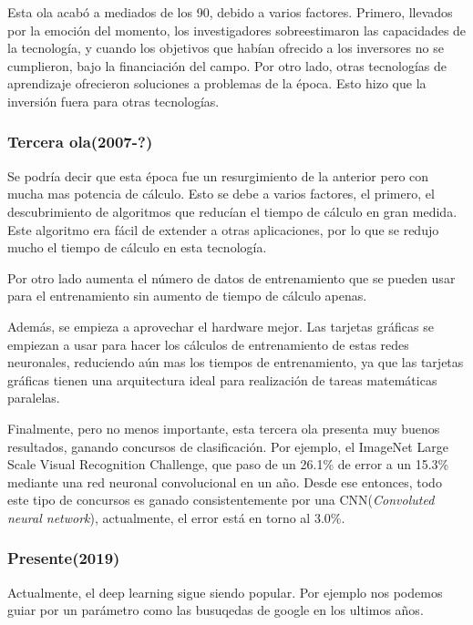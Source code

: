 \documentclass[12pt]{article}
\numberwithin{equation}{section}
\begin{document}
Esta ola acabó a mediados de los 90, debido a varios factores. Primero, llevados por la emoción del momento, los investigadores sobreestimaron las capacidades de la tecnología, y cuando los objetivos que habían ofrecido a los inversores no se cumplieron, bajo la financiación del campo. Por otro lado, otras tecnologías de aprendizaje ofrecieron soluciones a problemas de la época. Esto hizo que la inversión fuera para otras tecnologías.

\subsubsection{Tercera ola(2007-?)}
Se podría decir que esta época fue un resurgimiento de la anterior pero con mucha mas potencia de cálculo.  Esto se debe a varios factores, el primero, el descubrimiento de algoritmos que reducían el tiempo de cálculo en gran medida\cite{doi:10.1162/neco.2006.18.7.1527}. Este algoritmo era fácil de extender a otras aplicaciones, por lo que se redujo mucho el tiempo de cálculo en esta tecnología.

Por otro lado aumenta el número de datos de entrenamiento que se pueden usar para el entrenamiento sin aumento de tiempo de cálculo apenas.

Además, se empieza a aprovechar el hardware mejor. Las tarjetas gráficas se empiezan a usar para hacer los cálculos de entrenamiento de estas redes neuronales, reduciendo aún mas los tiempos de entrenamiento, ya que las tarjetas gráficas tienen una arquitectura  ideal para realización de tareas matemáticas paralelas.

Finalmente, pero no menos importante, esta tercera ola presenta muy buenos resultados, ganando concursos de clasificación. Por ejemplo, el ImageNet Large Scale Visual Recognition Challenge, que paso de un 26.1\% de error a un 15.3\%\cite{concursos} mediante una red neuronal convolucional en un año. Desde ese entonces, todo este tipo de concursos es ganado consistentemente por una CNN(\textit{Convoluted neural network}), actualmente, el error está en torno al 3.0\%.

\subsubsection{Presente(2019)}

Actualmente, el deep learning sigue siendo popular. Por ejemplo nos podemos guiar por un parámetro como las busuqedas de google en los ultimos años.
\end{document}
